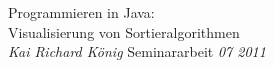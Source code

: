 \documentclass[dvips,letterpaper,12pt]{report}
\begin{document}

\thesistitle
	{Programmieren in Java: \\
	 Visualisierung von Sortieralgorithmen\\}
	{\emph{Kai Richard König}}
	{Seminararbeit}
	{\emph{07 2011}}


% 

% 
% 



% 
% 
% 
% 
% 



% 
\end{document}
